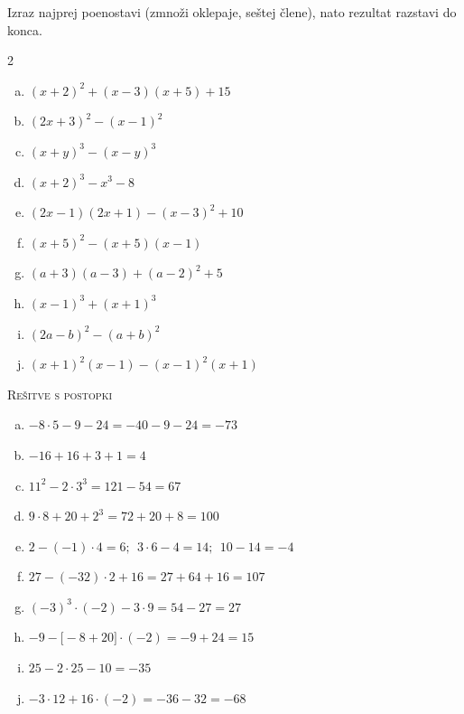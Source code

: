 \documentclass[a4paper,12pt]{letter}
\newcounter{tocke}
\begin{document}
\begin{naloga}[\hfill $\tockeL$] \addtocounter{tocke}{\numexpr\tockeL\relax}
Izraz najprej poenostavi (zmnoži oklepaje, se\v{s}tej \v{c}lene), nato rezultat razstavi do konca.
\begin{multicols}{2}
\begin{enumerate}[a)]
\item $\displaystyle (x+2)^2+(x-3)(x+5)+15$
\item $\displaystyle (2x+3)^2-(x-1)^2$
\item $\displaystyle (x+y)^3-(x-y)^3$
\item $\displaystyle (x+2)^3-x^3-8$
\item $\displaystyle (2x-1)(2x+1)-(x-3)^2+10$
\end{enumerate}
\columnbreak
\begin{enumerate}[a)]\setcounter{enumi}{5}
\item $\displaystyle (x+5)^2-(x+5)(x-1)$
\item $\displaystyle (a+3)(a-3)+(a-2)^2+5$
\item $\displaystyle (x-1)^3+(x+1)^3$
\item $\displaystyle (2a-b)^2-(a+b)^2$
\item $\displaystyle (x+1)^2(x-1)-(x-1)^2(x+1)$
\end{enumerate}
\end{multicols}
\end{naloga}

\small
\newpage
\textsc{\Large Re\v{s}itve s postopki}
\vspace{0.5cm}

\begin{resitev}
\begin{enumerate}[a)]
\item $\displaystyle -8\cdot5-9-24=-40-9-24=-73$
\item $\displaystyle -16+16+3+1=4$
\item $\displaystyle 11^2-2\cdot3^3=121-54=67$
\item $\displaystyle 9\cdot8+20+2^3=72+20+8=100$
\item $\displaystyle 2-(-1)\cdot4=6;\ \ 3\cdot6-4=14;\ \ 10-14=-4$
\item $\displaystyle 27-(-32)\cdot2+16=27+64+16=107$
\item $\displaystyle (-3)^3\cdot(-2)-3\cdot9=54-27=27$
\item $\displaystyle -9-\big[-8+20\big]\cdot(-2)=-9+24=15$
\item $\displaystyle 25-2\cdot25-10=-35$
\item $\displaystyle -3\cdot12+16\cdot(-2)=-36-32=-68$
\end{enumerate}
\end{resitev}
\end{document}
